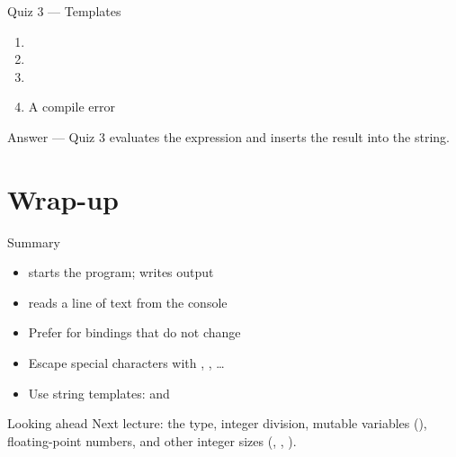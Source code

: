 \documentclass[aspectratio=169,11pt]{beamer}
\begin{document}
    \begin{frame}{Quiz 3 --- Templates}
        \begin{enumerate}
            \item {}
            \item {}
            \item {}
            \item A compile error
        \end{enumerate}
        \quizpause
    \end{frame}

    \begin{frame}{Answer --- Quiz 3}
        \vspace{0.4em}
         evaluates the expression and inserts the result into the string.
    \end{frame}

    \section{Wrap-up}

    \begin{frame}{Summary}
        \begin{itemize}
            \item {} starts the program;  writes output
            \item {} reads a line of text from the console
            \item Prefer  for bindings that do not change
            \item Escape special characters with , , \ldots
            \item Use string templates:  and 
        \end{itemize}
    \end{frame}

    \begin{frame}{Looking ahead}
        Next lecture: the  type, integer division, mutable variables
        (), floating-point numbers, and other integer sizes
        (, , ).
    \end{frame}
\end{document}
